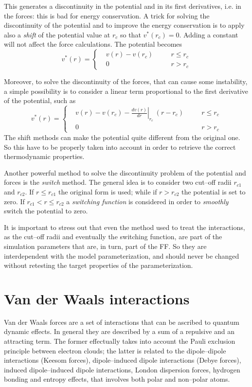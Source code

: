 This generates a discontinuity in the potential and in its first derivatives, i.e. in the forces: this is bad for
energy conservation. A trick for solving the discontinuity of the potential and to improve the energy
conservation is to apply also a \textit{shift} of the potential value at $r_c$ so that $v^*(r_c) = 0$. Adding a
constant will not affect the force calculations. The potential becomes
\begin{equation*}
v^*(r) = \left \{
	\begin{aligned}
&v(r) - v(r_c) & \quad & r \le r_c \\
&0    & \quad  & r >   r_c
	\end{aligned} \right .
\end{equation*}

Moreover, to solve the discontinuity of the forces, that can cause some instability, a simple possibility is to
consider a linear term proportional to the first derivative of the potential, such as
\begin{equation*}
v^*(r) = \left \{
	\begin{aligned}
&v(r) - v(r_c) - \left . \frac{dv(r)}{dr}\right |_{r_c}\ (r - r_c) & \quad & r \le r_c \\
&0    & \quad  & r >   r_c
	\end{aligned} \right .
\end{equation*}
The shift methods can make the potential quite different from the original one. So this have to be properly taken
into account in order to retrieve the correct thermodynamic properties.

Another powerful method to solve the discontinuity problem of the potential and forces is the \textit{switch}
method. The general idea is to consider two cut--off radii  $r_{c1}$ and $r_{c2}$. If $r \le r_{c1}$ the original
form is used; while if $r > r_{c2}$ the potential is set to zero. If $r_{c1} < r \le r_{c2}$ a \textit{switching
function} is considered in order to \textit{smoothly} switch the potential to zero.

It is important to stress out that even the method used to treat the interactions, as the cut--off radii and
eventually the switching function, are part of the simulation parameters that are, in turn, part of the \ac{FF}.
So they are interdependent with the model parameterization, and should never be changed without retesting the
target properties of the parameterization.

\section{Van der Waals interactions}
Van der Waals forces are a set of interactions that can be ascribed to quantum dynamic effects. In general they
are described by a sum of a repulsive and an attracting term. The former effectually takes into account the Pauli
exclusion principle between electron clouds; the latter is related to the dipole--dipole interactions (Keesom
forces), dipole--induced dipole interactions (Debye forces), induced dipole--induced dipole interactions, London
dispersion forces, hydrogen bonding and entropy effects, that involves both polar and non--polar atoms.


